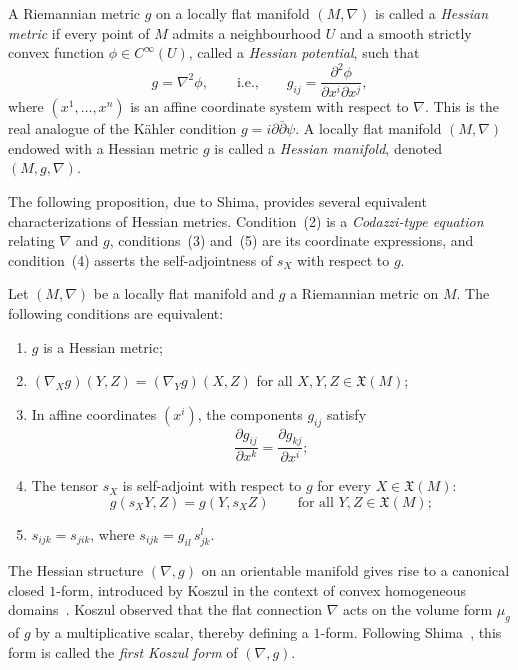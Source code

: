 \begin{defn}
A Riemannian metric $g$ on a locally flat manifold $(M, \nabla)$ is called a 
\emph{Hessian metric} if every point of $M$ admits a neighbourhood $U$ and a 
smooth strictly convex function $\phi \in C^\infty(U)$, called a 
\emph{Hessian potential}, such that
\[
  g = \nabla^2 \phi, \qquad \text{i.e.,} \qquad
  g_{ij} = \frac{\partial^2 \phi}{\partial x^i \partial x^j},
\]
where $(x^1, \dots, x^n)$ is an affine coordinate system with respect to $\nabla$.
This is the real analogue of the K\"ahler condition $g = i\partial\bar\partial\psi$.
A locally flat manifold $(M, \nabla)$ endowed with a Hessian metric $g$ is called a 
\emph{Hessian manifold}, denoted $(M, g, \nabla)$.
\end{defn}

The following proposition, due to Shima, provides several equivalent 
characterizations of Hessian metrics. Condition~(2) is a \emph{Codazzi-type 
equation} relating $\nabla$ and $g$, conditions~(3) and~(5) are its coordinate 
expressions, and condition~(4) asserts the self-adjointness of $s_X$ with respect 
to $g$.

\begin{prop}
Let $(M, \nabla)$ be a locally flat manifold and $g$ a Riemannian metric on $M$.
The following conditions are equivalent:
\begin{enumerate}
  \item $g$ is a Hessian metric;
  \item $(\nabla_X g)(Y,Z) = (\nabla_Y g)(X,Z)$ for all 
        $X, Y, Z \in \mathfrak{X}(M)$;
  \item In affine coordinates $(x^i)$, the components $g_{ij}$ satisfy
        \[
          \frac{\partial g_{ij}}{\partial x^k} = \frac{\partial g_{kj}}{\partial x^i};
        \]
  \item The tensor $s_X$ is self-adjoint with respect to $g$ for every 
        $X \in \mathfrak{X}(M)$:
        \[
          g(s_X Y, Z) = g(Y, s_X Z) \qquad 
          \text{for all } Y, Z \in \mathfrak{X}(M);
        \]
  \item $s_{ijk} = s_{jik}$, where $s_{ijk} = g_{il}\, s^l_{jk}$.
\end{enumerate}
\end{prop}

The Hessian structure $(\nabla, g)$ on an orientable manifold gives rise to a 
canonical closed $1$-form, introduced by Koszul in the context of convex 
homogeneous domains~\citep{koszul1961}. Koszul observed that the flat 
connection $\nabla$ acts on the volume form $\mu_g$ of $g$ by a multiplicative 
scalar, thereby defining a $1$-form. Following Shima~\citep{shima2007}, 
this form is called the \emph{first Koszul form} of $(\nabla, g)$.

